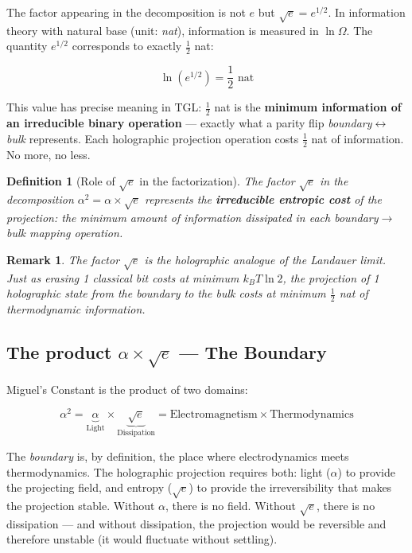 \documentclass[12pt,a4paper,twoside]{article}
\newtheorem{definition}[theorem]{Definition}
\newtheorem{remark}[theorem]{Remark}
\newcommand{\alphaii}{\alpha^{2}}
\newcommand{\boundary}{\textit{boundary}}
\newcommand{\bulk}{\textit{bulk}}
\begin{document}
The factor appearing in the decomposition is not $e$ but $\sqrt{e} = e^{1/2}$. In information theory with natural base (unit: \textit{nat}), information is measured in $\ln \Omega$. The quantity $e^{1/2}$ corresponds to exactly $\frac{1}{2}$ nat:

\begin{equation}
\ln(e^{1/2}) = \frac{1}{2} \text{ nat}
\end{equation}

This value has precise meaning in TGL: $\frac{1}{2}$ nat is the \textbf{minimum information of an irreducible binary operation} --- exactly what a parity flip \boundary$\leftrightarrow$\bulk{} represents. Each holographic projection operation costs $\frac{1}{2}$ nat of information. No more, no less.

\begin{definition}[Role of $\sqrt{e}$ in the factorization]
The factor $\sqrt{e}$ in the decomposition $\alphaii = \alpha \times \sqrt{e}$ represents the \textbf{irreducible entropic cost} of the projection: the minimum amount of information dissipated in each \boundary$\to$\bulk{} mapping operation.
\end{definition}

\begin{remark}
The factor $\sqrt{e}$ is the holographic analogue of the Landauer limit. Just as erasing 1 classical bit costs at minimum $k_B T \ln 2$, the projection of 1 holographic state from the \boundary{} to the \bulk{} costs at minimum $\frac{1}{2}$ nat of thermodynamic information.
\end{remark}


\subsection{The product $\alpha \times \sqrt{e}$ --- The Boundary}

Miguel's Constant is the product of two domains:

\begin{factorbox}[title={Synthesis}]
\begin{equation}
\alphaii = \underbrace{\alpha}_{\text{Light}} \times \underbrace{\sqrt{e}}_{\text{Dissipation}} = \text{Electromagnetism} \times \text{Thermodynamics}
\label{eq:sintese}
\end{equation}
\end{factorbox}

\noindent The \boundary{} is, by definition, the place where electrodynamics meets thermodynamics. The holographic projection requires both: light ($\alpha$) to provide the projecting field, and entropy ($\sqrt{e}$) to provide the irreversibility that makes the projection stable. Without $\alpha$, there is no field. Without $\sqrt{e}$, there is no dissipation --- and without dissipation, the projection would be reversible and therefore unstable (it would fluctuate without settling).
\end{document}
